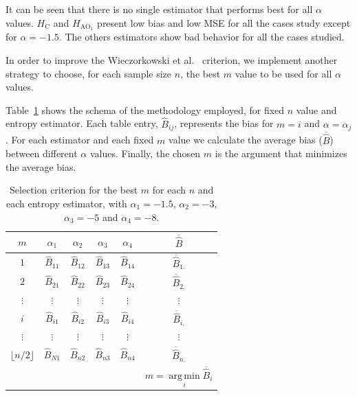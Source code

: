 \documentclass[journal]{IEEEtran}
\DeclareMathOperator*{\argmin}{arg\,min}
\begin{document}

It can be seen that there is no single estimator that performs best for all $\alpha$ values. 
$H_\text{C}$ and $H_{\text{AO}_1}$ present low bias and low MSE for all the cases study except for $\alpha=-1.5$. 
The others estimators show bad behavior for all the cases studied.	

In order to improve the Wieczorkowski et al.~\cite{Wieczorkowski1999} criterion, we implement another strategy to choose, for each sample size $n$, the best $m$ value to be used for all $\alpha$ values.

Table~\ref{tab:eleccion_mejor_m} shows the schema of the methodology employed, for fixed $n$ value and entropy estimator. 
Each table entry, $\widehat{B}_{ij}$, represents the bias for $m=i$ and $\alpha= \alpha_j$. 
For each estimator and each fixed $m$ value we calculate the average bias ($\overline{\widehat{B}}$) between different $\alpha$ values. Finally, the chosen $m$ is the argument that minimizes the average bias.

\begin{table}[hbt]
	\caption{Selection criterion for the best $m$ for each $n$ and each entropy estimator, with $\alpha_1= -1.5$, $\alpha_2=-3$, $\alpha_3=-5$ and $\alpha_4=-8$.}
	\label{tab:eleccion_mejor_m}
	\centering
	\begin{tabular}{c c c c c c}
		\toprule
		$m$	& $\alpha_{1}$ & $\alpha_{2}$
		& $\alpha_{3}$
		& $\alpha_{4}$ & $\overline{\widehat{B}}$ \\
		
		\midrule
		$1$	& $\widehat{B}_{11}$ & $\widehat{B}_{12}$ & $\widehat{B}_{13}$ & $\widehat{B}_{14}$ & $\overline{\widehat{B}}_{1.}$\\
		
		$2$	& $\widehat{B}_{21}$ & $\widehat{B}_{22}$ & $\widehat{B}_{23}$ & $\widehat{B}_{24}$ & $\overline{\widehat{B}}_{2.}$\\
		$\vdots$ & $\vdots$ & $\vdots$ & $\vdots$ & $\vdots$ & $\vdots$ \\
		
		$i$ & $\widehat{B}_{i1}$ & $\widehat{B}_{i2}$ & $\widehat{B}_{i3}$ & $\widehat{B}_{i4}$ & $\overline{\widehat{B}}_{i.}$\\
		$\vdots$ & $\vdots$ & $\vdots$ & $\vdots$ & $\vdots$ & $\vdots$\\
		
		$\lfloor n/2 \rfloor$ & $\widehat{B}_{N1}$ & $\widehat{B}_{n2}$ & $\widehat{B}_{n3}$ & $\widehat{B}_{n4}$ & $\overline{\widehat{B}}_{n.}$\\
		\bottomrule
		& & & & & $m=\argmin\limits_{i} \overline{\widehat{B}}_{i}$\\
		
		\bottomrule
	\end{tabular}
\end{table}	
\end{document}
